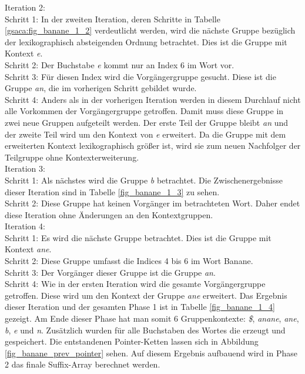 Iteration 2:\\
Schritt 1: In der zweiten Iteration, deren Schritte in Tabelle \ref{gsaca:fig_banane_1_2} verdeutlicht werden, wird die nächste Gruppe bezüglich der lexikographisch absteigenden Ordnung betrachtet. 
Dies ist die Gruppe mit Kontext \textit{e}.\\
Schritt 2: Der Buchstabe \textit{e} kommt nur an Index 6 im Wort vor.\\
Schritt 3: Für diesen Index wird die Vorgängergruppe gesucht. 
Diese ist die Gruppe \textit{an}, die im vorherigen Schritt gebildet wurde.\\
Schritt 4: Anders als in der vorherigen Iteration werden in diesem Durchlauf nicht alle Vorkommen der Vorgängergruppe getroffen. 
Damit muss diese Gruppe in zwei neue Gruppen aufgeteilt werden. 
Der erste Teil der Gruppe bleibt \textit{an} und der zweite Teil wird um den Kontext von \textit{e} erweitert. 
Da die Gruppe mit dem erweiterten Kontext lexikographisch größer ist, wird sie zum neuen Nachfolger der Teilgruppe ohne Kontexterweiterung.\\

Iteration 3:\\
Schritt 1: Als nächstes wird die Gruppe \textit{b} betrachtet. 
Die Zwischenergebnisse dieser Iteration sind in Tabelle \ref{fig_banane_1_3} zu sehen.\\
Schritt 2: Diese Gruppe hat keinen Vorgänger im betrachteten Wort. 
Daher endet diese Iteration ohne Änderungen an den Kontextgruppen.\\

Iteration 4: \\
Schritt 1: Es wird die nächste Gruppe betrachtet. Dies ist die Gruppe mit Kontext \textit{ane}.\\
Schritt 2: Diese Gruppe umfasst die Indices 4 bis 6 im Wort Banane.\\
Schritt 3: Der Vorgänger dieser Gruppe ist die Gruppe \textit{an}.\\
Schritt 4: Wie in der ersten Iteration wird die gesamte Vorgängergruppe getroffen. 
Diese wird um den Kontext der Gruppe \textit{ane} erweitert. 
Das Ergebnis dieser Iteration und der gesamten Phase 1 ist in Tabelle \ref{fig_banane_1_4} gezeigt. 
Am Ende dieser Phase hat man somit 6 Gruppenkontexte: \textit{\$}, \textit{anane}, \textit{ane}, \textit{b}, \textit{e} und \textit{n}. 
Zusätzlich wurden für alle Buchstaben des Wortes die \prevpointer erzeugt und gespeichert. 
Die entstandenen Pointer-Ketten lassen sich in Abbildung \ref{fig_banane_prev_pointer} sehen. 
Auf diesem Ergebnis aufbauend wird in Phase 2 das finale Suffix-Array berechnet werden.
\newpage		%

